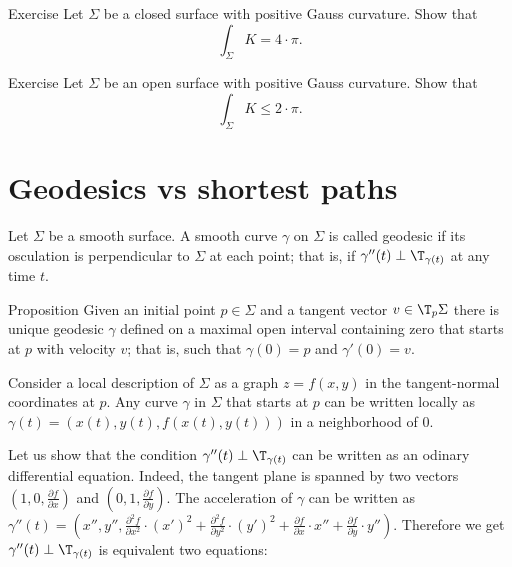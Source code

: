 \begin{thm}{Exercise}\label{ex:int-gauss=4pi}
Let $\Sigma$ be a closed surface with positive Gauss curvature.
Show that 
\[\int_\Sigma K=4\cdot\pi.\]

\end{thm}

\begin{thm}{Exercise}\label{ex:gauss-integral-open}
Let $\Sigma$ be an open surface with positive Gauss curvature.
Show that 
\[\int_\Sigma K\le 2\cdot\pi.\]

\end{thm}































\chapter{Geodesics vs shortest paths}

Let $\Sigma$ be a smooth surface.
A smooth curve $\gamma$ on $\Sigma$ is called geodesic if its osculation is perpendicular to $\Sigma$ at each point;
that is, if $\gamma''(t)\perp\T_{\gamma(t)}$ at any time $t$.

\begin{thm}{Proposition}
Given an initial point $p\in \Sigma$ and a tangent vector $v\in\T_p\Sigma$ there is unique geodesic $\gamma$ defined on a maximal open interval containing zero that starts at $p$ with velocity $v$; that is,
such that $\gamma(0)=p$ and $\gamma'(0)=v$.
\end{thm}

Consider a local description of $\Sigma$ as a graph $z=f(x,y)$ in the tangent-normal coordinates at $p$.
Any curve $\gamma$ in $\Sigma$ that starts at $p$ can be written locally as 
$\gamma(t)=(x(t),y(t),f(x(t),y(t)))$ in a neighborhood of $0$.

Let us show that the condition $\gamma''(t)\perp\T_{\gamma(t)}$ can be written as an odinary differential equation.
Indeed, the tangent plane is spanned by two vectors $(1,0,\tfrac{\partial f}{\partial x})$ and $(0,1,\tfrac{\partial f}{\partial y})$.
The acceleration of $\gamma$ can be written as $\gamma''(t)=(x'',y'',\tfrac{\partial^2 f}{\partial x^2}\cdot (x')^2+\tfrac{\partial^2 f}{\partial y^2}\cdot (y')^2+\tfrac{\partial f}{\partial x}\cdot x''+\tfrac{\partial f}{\partial y}\cdot y'')$.
Therefore we get $\gamma''(t)\perp\T_{\gamma(t)}$ is equivalent two equations:




